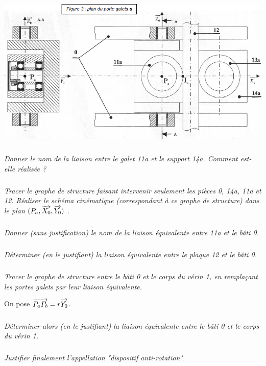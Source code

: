 \documentclass[10pt]{article}
\begin{document}
\begin{center}
\includegraphics[width=.8\textwidth]{images/traction3}
\end{center}

\subparagraph{}
\textit{Donner le nom de la liaison entre le galet 11a et le support 14a. Comment est-elle
réalisée ?}

\subparagraph{}
\textit{Tracer le graphe de structure faisant intervenir seulement les pièces 0, 14a, 11a et 12.
Réaliser le schéma cinématique (correspondant à ce graphe de structure) dans le plan
$(P_a,\overrightarrow{X_0},\overrightarrow{Y_0})$ .}

\subparagraph{}
\textit{Donner (sans justification) le nom de la liaison équivalente entre 11a et le bâti 0.}

\subparagraph{}
\textit{Déterminer (en le justifiant) la liaison équivalente entre le plaque 12 et le bâti 0.}


\subparagraph{}
\textit{Tracer le graphe de structure entre le bâti 0 et le corps du vérin 1, en remplaçant les
portes galets par leur liaison équivalente.}

On pose $\overrightarrow{P_aP_b}=r \overrightarrow{Y_0}$.

\subparagraph{}
\textit{Déterminer alors (en le justifiant) la liaison équivalente entre le bâti 0 et le corps du
vérin 1.}

\subparagraph{}
\textit{Justifier finalement l'appellation "dispositif anti-rotation".}
\end{document}
